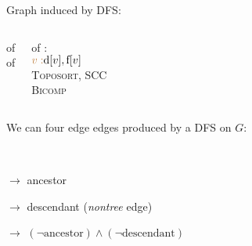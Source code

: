 
\begin{frame}{} 
  \centerline{\large Graph  induced by DFS:}

  \vspace{0.50cm}
  \begin{columns}
      \begin{center}
	 of  \\[15pt]

	 of 
      \end{center}
    \pause
      \begin{center}
	 of : \\[15pt]

	$\textcolor{brown}{v:} \text{d}[v], \text{f}[v]$ \\[10pt]

	 \textsc{Toposort}, \textsc{SCC} \\[10pt]

	 \textsc{Bicomp} {\footnotesize {}}
      \end{center}
  \end{columns}
\end{frame}

\begin{frame}{}
  \begin{definition}
    We can  four edge edges  produced by a DFS on $G$:
    \begin{description}
      \setlength{\itemsep}{5pt}
      \item[Tree edge:]  \\[12pt]
      \item[Back edge:] $\to$ ancestor
      \item[Forward edge:] $\to$ descendant {\small ({\it nontree} edge)}
      \item[Cross edge:] $\to$ $(\lnot \text{ancestor}) \land (\lnot \text{descendant})$
    \end{description}
  \end{definition}

\end{frame}

